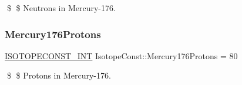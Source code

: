 \$ \$ Neutrons in Mercury-\/176. \mbox{\label{group___isotope_const-_mercury-_hg176_gacdfb43cbb8f501927cebb88d50ac988d}} 
\subsubsection{\texorpdfstring{Mercury176\+Protons}{Mercury176Protons}}
{\footnotesize\ttfamily \mbox{\hyperlink{group___isotope_const-_macros_ga5f18360b3e99483a35c32d789e62621c}{I\+S\+O\+T\+O\+P\+E\+C\+O\+N\+S\+T\+\_\+\+I\+NT}} Isotope\+Const\+::\+Mercury176\+Protons = 80}

\$ \$ Protons in Mercury-\/176. 